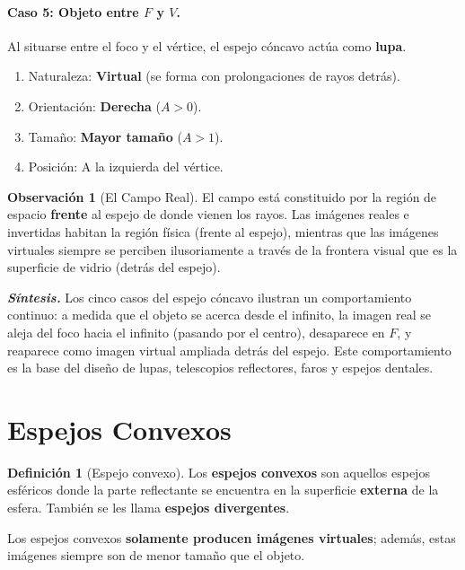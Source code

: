 \documentclass[12pt, a4paper]{article}
\theoremstyle{definition}
\newtheorem{definicion}{Definición}[section]
\newtheorem{observacion}{Observación}[section]
\begin{document}
\paragraph{Caso 5: Objeto entre \(F\) y \(V\).}
Al situarse entre el foco y el vértice, el espejo cóncavo actúa como \textbf{lupa}.
\begin{enumerate}
  \item Naturaleza: \textbf{Virtual} (se forma con prolongaciones de rayos detrás).
  \item Orientación: \textbf{Derecha} (\(A > 0\)).
  \item Tamaño: \textbf{Mayor tamaño} (\(A > 1\)).
  \item Posición: A la izquierda del vértice.
\end{enumerate}

\begin{observacion}[El Campo Real]
El campo está constituido por la región de espacio \textbf{frente} al espejo de donde vienen los rayos. Las imágenes reales e invertidas habitan la región física (frente al espejo), mientras que las imágenes virtuales siempre se perciben ilusoriamente a través de la frontera visual que es la superficie de vidrio (detrás del espejo).
\end{observacion}

\textit{\textbf{Síntesis.}} Los cinco casos del espejo cóncavo ilustran un comportamiento continuo: a medida que el objeto se acerca desde el infinito, la imagen real se aleja del foco hacia el infinito (pasando por el centro), desaparece en \(F\), y reaparece como imagen virtual ampliada detrás del espejo. Este comportamiento es la base del diseño de lupas, telescopios reflectores, faros y espejos dentales.

\section{Espejos Convexos}

\begin{definicion}[Espejo convexo]
Los \textbf{espejos convexos} son aquellos espejos esféricos donde la parte reflectante se encuentra en la superficie \textbf{externa} de la esfera. También se les llama \textbf{espejos divergentes}.
\end{definicion}

Los espejos convexos \textbf{solamente producen imágenes virtuales}; además, estas imágenes siempre son de menor tamaño que el objeto.
\end{document}
